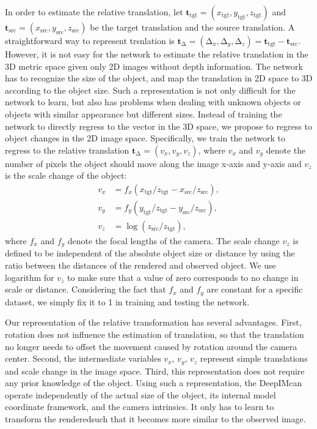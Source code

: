 \documentclass[twocolumn]{svjour3}
\newcommand{\dimnet}[0]{DeepIM}
\newcommand{\rend}[0]{rendered}
\begin{document}
In order to estimate the relative translation, let $\mathbf{t}_{\text{tgt}}=(x_{\text{tgt}}, y_{\text{tgt}}, z_{\text{tgt}})$ and $\mathbf{t}_{\text{src}}=(x_{\text{src}}, y_{\text{src}}, z_{\text{src}})$ be the target translation and the source translation. A straightforward way to represent trsnlation is  $\mathbf{t}_\mathrm{\Delta} = (\mathrm{\Delta}_x, \mathrm{\Delta}_y, \mathrm{\Delta}_z) = \mathbf{t}_{\text{tgt}} - \mathbf{t}_{\text{src}} $. However, it is not easy for the network to estimate the relative translation in the 3D metric space given only 2D images without depth information. The network has to recognize the size of the object, and map the translation in 2D space to 3D according to the object size. Such a representation is not only difficult for the network to learn, but also has problems when dealing with unknown objects or objects with similar appearance but different sizes. Instead of training the network to directly regress to the vector in the 3D space, we propose to regress to object changes in the 2D image space. Specifically, we train the network to regress to the relative translation $\mathbf{t}_\mathrm{\Delta} = (v_x, v_y, v_z)$, where $v_x$ and $v_y$ denote the number of pixels the object should move along the image x-axis and y-axis and $v_z$ is  the scale change of the object:
\begin{equation}
\begin{split}
v_x &= f_x (x_{\text{tgt}} / z_{\text{tgt}} - x_{\text{src}} / z_{\text{src}}), \\
v_y &= f_y (y_{\text{tgt}} / z_{\text{tgt}} - y_{\text{src}} / z_{\text{src}}), \\
v_z &= \log(z_{\text{src}} / z_{\text{tgt}}),
\end{split}
\label{eq.2d_translation}
\end{equation}
where $f_x$ and $f_y$ denote the focal lengths of the camera. The scale change $v_z$ is defined to be independent of the absolute object size or distance by using the ratio between the distances of the rendered and observed object. We use logarithm for $v_z$ to make sure that a value of zero corresponds to no change in scale or distance. Considering the fact that $f_x$ and $f_y$ are constant for a specific dataset, we simply fix it to 1 in training and testing the network.



Our representation of the relative transformation has several advantages. First, rotation does not influence the estimation of translation, so that the translation no longer needs to offset the movement caused by rotation around the camera center. Second, the intermediate variables $v_x$, $v_y$, $v_z$ represent simple translations and scale change in the image space. Third, this representation does not require any prior knowledge of the object. Using such a representation, the \dimnet\network  can operate independently of the actual size of the object, its internal model coordinate framework, and the camera intrinsics. It only has to learn to transform the \rend\image such that it becomes more similar to the observed image.
\end{document}
